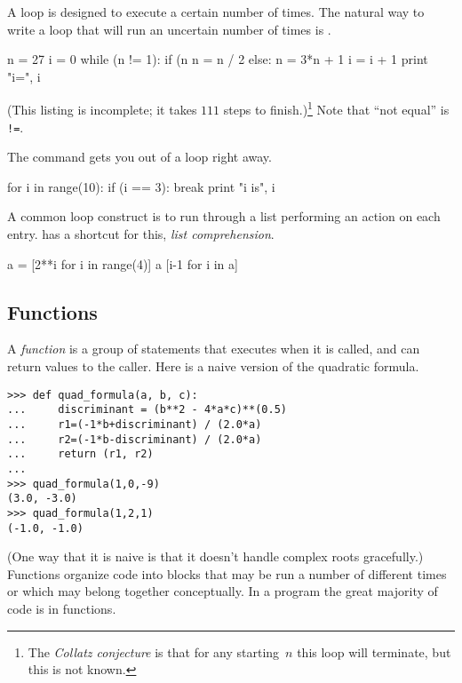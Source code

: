 A  loop is designed to execute a certain
number of times.
The natural way to write a loop that will run an uncertain number of times
is .
\begin{pythonoutput}[d,12,121]
n = 27
i = 0
while (n != 1):
    if (n%
        n = n / 2
    else:
        n = 3*n + 1
    i = i + 1
    print "i=", i
 
\end{pythonoutput}
(This listing is incomplete; it takes $111$ steps to finish.)\footnote{The 
\protect\textit{Collatz conjecture} is 
that for any starting~$n$ this loop will 
terminate, but this is not known.}
Note that ``not equal'' is \lstinline[style=inline]@!=@. 

The  command gets you out of a loop right away.
\begin{pythonoutput}
for i in range(10):
    if (i == 3):
        break
    print "i is", i

\end{pythonoutput}

A common loop construct is to run through a list
performing an action on each entry.
\python{} has a shortcut for this, \textit{list comprehension}.
\begin{pythonoutput}
a = [2**i for i in range(4)]
a
[i-1 for i in a]
\end{pythonoutput}



\subsection{Functions}
A \textit{function} is a group of statements that executes when it is called,
and can return values to the caller.
Here is a naive version of the quadratic formula.
\begin{lstlisting}[style=python]
>>> def quad_formula(a, b, c):
...     discriminant = (b**2 - 4*a*c)**(0.5)
...     r1=(-1*b+discriminant) / (2.0*a)
...     r2=(-1*b-discriminant) / (2.0*a)
...     return (r1, r2)
... 
>>> quad_formula(1,0,-9)
(3.0, -3.0)
>>> quad_formula(1,2,1)
(-1.0, -1.0)
\end{lstlisting}
(One way that it is naive is that it doesn't handle complex roots gracefully.)
Functions organize code into blocks that may be 
run a number of different times or which may belong together conceptually. 
In a \python{} program the great majority of code is in functions. 

